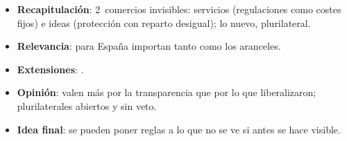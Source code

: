 \documentclass{article}
\begin{document}
\begin{columnas}
\begin{itemize}
\item \textbf{Recapitulación}: 2~comercios invisibles: servicios (regulaciones como costes fijos) e ideas (protección con reparto desigual); lo nuevo, plurilateral.
\item \textbf{Relevancia}: para España importan tanto como los aranceles.
\item \textbf{Extensiones}:      .
\item \textbf{Opinión}: valen más por la transparencia que por lo que liberalizaron; plurilaterales abiertos y sin veto.
\item \textbf{Idea final}: se pueden poner reglas a lo que no se ve si antes se hace visible.
\end{itemize}


\end{columnas}
\end{document}
